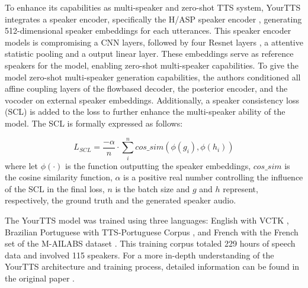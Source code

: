 To enhance its capabilities as multi-speaker and zero-shot TTS system, YourTTS integrates a speaker encoder, specifically the H/ASP speaker encoder \cite{heo2020clova}, generating 512-dimensional speaker embeddings for each utterances. This speaker encoder models is compromising a CNN layers, followed by four Resnet layers \cite{targ2016resnet}, a attentive statistic pooling and a output linear layer. These embeddings serve as reference speakers for the model, enabling zero-shot multi-speaker capabilities. To give the model zero-shot multi-speaker generation capabilities, the authors conditioned all affine coupling layers of the flowbased decoder, the posterior encoder, and the vocoder on external speaker embeddings. Additionally, a speaker consistency loss (SCL) is added to the loss to further enhance the multi-speaker ability of the model. The SCL is formally expressed as follows:

\begin{equation}
    L_{SCL} = \frac{-\alpha}{n} \cdot \sum_{i}^{n} cos\_sim(\phi(g_i), \phi(h_i))
\end{equation}
where let $\phi(\cdot)$ is the function outputting the speaker embeddings, $cos\_sim$ is the cosine similarity function, $\alpha$ is a positive real number controlling the influence of the SCL in the final loss, $n$ is the batch size and $g$ and $h$ represent, respectively, the ground truth and the generated speaker audio.

The YourTTS model was trained using three languages: English with VCTK \cite{veaux2016superseded}, Brazilian Portuguese with TTS-Portuguese Corpus \cite{casanova2022tts}, and French with the French set of the M-AILABS dataset \cite{mailabs}. This training corpus totaled 229 hours of speech data and involved 115 speakers. For a more in-depth understanding of the YourTTS architecture and training process, detailed information can be found in the original paper \cite{casanova2022yourtts}.


